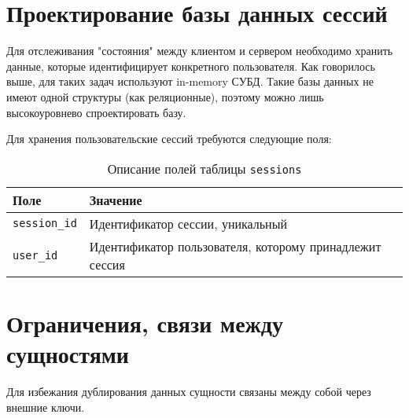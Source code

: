 \section{Проектирование базы данных сессий}
Для отслеживания "состояния" между клиентом и сервером необходимо хранить данные, которые идентифицирует конкретного пользователя. Как говорилось выше, для таких задач используют in-memory СУБД.  
Такие базы данных не имеют одной структуры (как реляционные), поэтому можно лишь высокоуровнево спроектировать базу.

Для хранения пользовательские сессий требуются следующие поля:
\begin{table}[!ht]
    \caption{Описание полей таблицы \texttt{sessions}}
    \label{tbl:sessions}
    \begin{center}
        \begin{tabular}{|p{}p{}|}
            \hline
            \textbf{Поле} & \textbf{Значение} \\\hline
            \texttt{session\_id} & Идентификатор сессии, уникальный \\\hline
            \texttt{user\_id} & Идентификатор пользователя, которому принадлежит сессия \\\hline
        \end{tabular}
    \end{center}
\end{table}

\section{Ограничения, связи между сущностями}
Для избежания дублирования данных сущности связаны между собой через внешние ключи.
